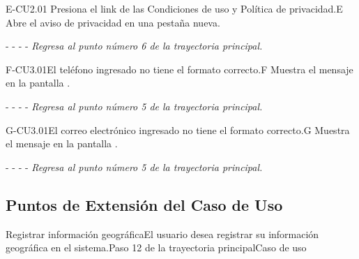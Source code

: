 \begin{UCtrayectoriaA}{E-CU2.01}{ Presiona el link de las Condiciones de uso y  Política de privacidad.}{E}
		\UCpaso[\UCsist] Abre el aviso de privacidad en una pestaña nueva.
		\item[- -] - - {\em Regresa al punto número 6 de la trayectoria principal.} 
	\end{UCtrayectoriaA}
	
		\begin{UCtrayectoriaA}{F-CU3.01}{El teléfono ingresado no tiene el formato correcto.}{F}
			\UCpaso[\UCsist] Muestra el mensaje  en la pantalla .
			\item[- -] - - {\em Regresa al punto número 5 de la trayectoria principal.} 
    \end{UCtrayectoriaA}
    
    \begin{UCtrayectoriaA}{G-CU3.01}{El correo electrónico ingresado no tiene el formato correcto.}{G}
			\UCpaso[\UCsist] Muestra el mensaje  en la pantalla .
			\item[- -] - - {\em Regresa al punto número 5 de la trayectoria principal.} 
    \end{UCtrayectoriaA}

	\subsection{Puntos de Extensión del Caso de Uso}
	
	\begin{UCExtenssionPoint}{Registrar información geográfica}{El usuario desea registrar su información geográfica en el sistema.}{Paso 12 de la trayectoria principal}{Caso de uso } 
	\end{UCExtenssionPoint}